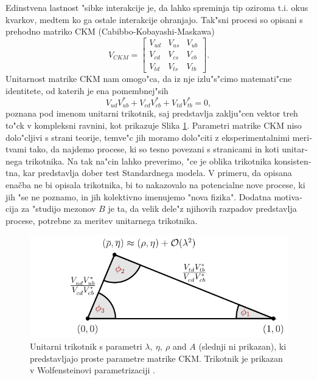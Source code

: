 \begin{otherlanguage}{slovene}
Edinstvena lastnost "sibke interakcije je, da lahko spreminja tip oziroma t.i. okus kvarkov, medtem ko ga ostale interakcije ohranjajo. Tak"sni procesi so opisani s prehodno matriko CKM (Cabibbo-Kobayashi-Maskawa) \cite{cabibbo1963unitary,kobayashi1973cp}
\begin{equation}
V_{CKM} = \begin{bmatrix}
    V_{ud} & V_{us} & V_{ub}\\
	V_{cd} & V_{cs} & V_{cb}\\
	V_{td} & V_{ts} & V_{tb}
\end{bmatrix}.
\end{equation}
Unitarnost matrike CKM nam omogo"ca, da iz nje izlu"s"cimo matemati"cne identitete, od katerih je ena pomembnej"sih
\begin{equation}
V_{ud}V_{ub}^* + V_{cd}V_{cb}^* + V_{td}V_{tb}^* = 0,
\end{equation}
poznana pod imenom unitarni trikotnik, saj predstavlja zaklju"cen vektor treh to"ck v kompleksni ravnini, kot prikazuje Slika \ref{fig:ut_si}. Parametri matrike CKM niso dolo"cljivi s strani teorije, temve"c jih moramo dolo"citi z eksperimentalnimi meritvami tako, da najdemo procese, ki so tesno povezani s stranicami in koti unitarnega trikotnika. Na tak na"cin lahko preverimo, "ce je oblika trikotnika konsistentna, kar predstavlja dober test Standardnega modela. V primeru, da opisana enačba ne bi opisala trikotnika, bi to nakazovalo na potencialne nove procese, ki jih "se ne poznamo, in jih kolektivno imenujemo "nova fizika". Dodatna motivacija za "studijo mezonov $B$ je ta, da velik dele"z njihovih razpadov predstavlja procese, potrebne za meritev unitarnega trikotnika.
\begin{figure}[H]
\centering
\includegraphics[scale=1]{texfig/UT_Triangle}
\caption{Unitarni trikotnik s parametri $\lambda,~\eta,~\rho$ and $A$ (slednji ni prikazan), ki predstavljajo proste parametre matrike CKM. Trikotnik je prikazan v Wolfensteinovi parametrizaciji \cite{PhysRevLett.51.1945}.}
\label{fig:ut_si}
\end{figure}


\end{otherlanguage}

